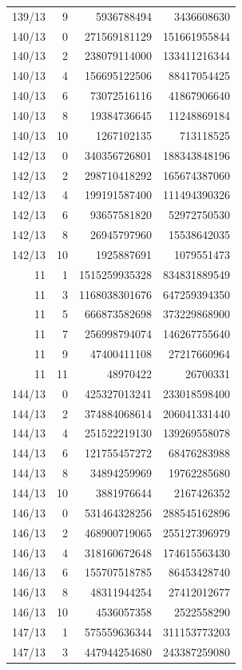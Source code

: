 \begin{longtable}{@{}rrrr@{}}
139/13 & 9 & 5936788494 & 3436608630\\
140/13 & 0 & 271569181129 & 151661955844\\
140/13 & 2 & 238079114000 & 133411216344\\
140/13 & 4 & 156695122506 & 88417054425\\
140/13 & 6 & 73072516116 & 41867906640\\
140/13 & 8 & 19384736645 & 11248869184\\
140/13 & 10 & 1267102135 & 713118525\\
142/13 & 0 & 340356726801 & 188343848196\\
142/13 & 2 & 298710418292 & 165674387060\\
142/13 & 4 & 199191587400 & 111494390326\\
142/13 & 6 & 93657581820 & 52972750530\\
142/13 & 8 & 26945797960 & 15538642035\\
142/13 & 10 & 1925887691 & 1079551473\\
11 & 1 & 1515259935328 & 834831889549\\
11 & 3 & 1168038301676 & 647259394350\\
11 & 5 & 666873582698 & 373229868900\\
11 & 7 & 256998794074 & 146267755640\\
11 & 9 & 47400411108 & 27217660964\\
11 & 11 & 48970422 & 26700331\\
144/13 & 0 & 425327013241 & 233018598400\\
144/13 & 2 & 374884068614 & 206041331440\\
144/13 & 4 & 251522219130 & 139269558078\\
144/13 & 6 & 121755457272 & 68476283988\\
144/13 & 8 & 34894259969 & 19762285680\\
144/13 & 10 & 3881976644 & 2167426352\\
146/13 & 0 & 531464328256 & 288545162896\\
146/13 & 2 & 468900719065 & 255127396979\\
146/13 & 4 & 318160672648 & 174615563430\\
146/13 & 6 & 155707518785 & 86453428740\\
146/13 & 8 & 48311944254 & 27412012677\\
146/13 & 10 & 4536057358 & 2522558290\\
147/13 & 1 & 575559636344 & 311153773203\\
147/13 & 3 & 447944254680 & 243387259080\\

\end{longtable}
